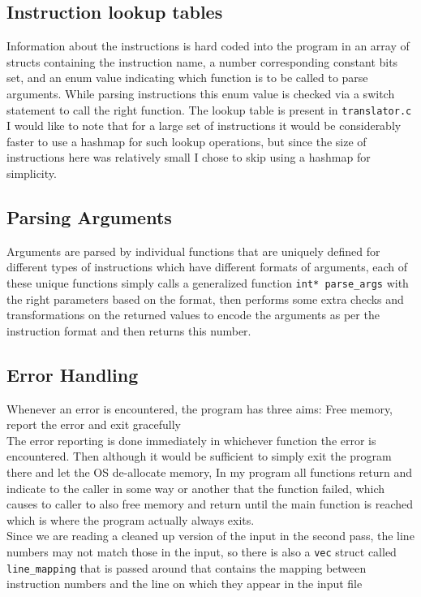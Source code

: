 \documentclass[12pt]{article}
\begin{document}
    \subsection{Instruction lookup tables}
    Information about the instructions is hard coded into the program in an array of structs containing the instruction name, a number corresponding constant bits set, and an enum value indicating which function is to be called to parse arguments. While parsing instructions this enum value is checked via a switch statement to call the right function. The lookup table is present in \verb#translator.c#
    \\

    I would like to note that for a large set of instructions it would be considerably faster to use a hashmap for such lookup operations, but since the size of instructions here was relatively small I chose to skip using a hashmap for simplicity.

    \subsection{Parsing Arguments}
    Arguments are parsed by individual functions that are uniquely defined for different types of instructions which have different formats of arguments, each of these unique functions simply calls a generalized function \verb#int* parse_args# with the right parameters based on the format, then performs some extra checks and transformations on the returned values to encode the arguments as per the instruction format and then returns this number.

    \subsection{Error Handling}
    Whenever an error is encountered, the program has three aims: Free memory, report the error and exit gracefully
    \\

    The error reporting is done immediately in whichever function the error is encountered. Then although it would be sufficient to simply exit the program there and let the OS de-allocate memory, In my program all functions return and indicate to the caller in some way or another that the function failed, which causes to caller to also free memory and return until the main function is reached which is where the program actually always exits.\\

    Since we are reading a cleaned up version of the input in the second pass, the line numbers may not match those in the input, so there is also a \verb|vec| struct called \verb|line_mapping| that is passed around that contains the mapping between instruction numbers and the line on which they appear in the input file
\end{document}
